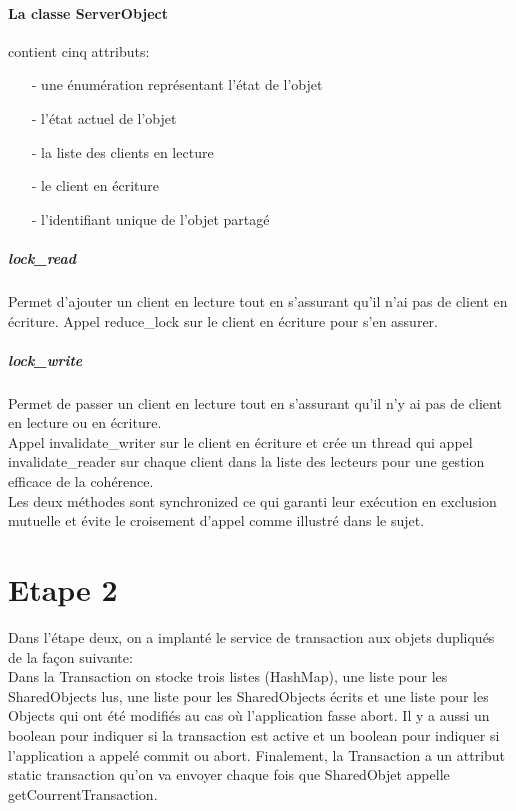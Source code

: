 \documentclass[a4paper,12pt]{article}
\begin{document}
\bigskip

\paragraph{La classe ServerObject}

 contient cinq attributs:
\begin{itemize}
\item[- une énumération représentant l'état de l'objet]
\item[- l'état actuel de l'objet]
\item[- la liste des clients en lecture]
\item[- le client en écriture]
\item[- l'identifiant unique de l'objet partagé]
\end{itemize}

\smallskip
\subparagraph{lock\_read}
Permet d'ajouter un client en lecture tout en s'assurant qu'il n'ai pas de client en écriture. Appel reduce\_lock sur le client en écriture pour s'en assurer.
\subparagraph{lock\_write}
Permet de passer un client en lecture tout en s'assurant qu'il n'y ai pas de client en lecture ou en écriture.\\
Appel invalidate\_writer sur le client en écriture et crée un thread qui appel invalidate\_reader sur chaque client dans la liste des lecteurs pour une gestion efficace de la cohérence.\\

Les deux méthodes sont synchronized ce qui garanti leur exécution en exclusion mutuelle et évite le croisement d'appel comme illustré dans le sujet.


\clearpage
\section{Etape 2}

\bigskip
\bigskip

Dans l’étape deux,  on a implanté le service de transaction aux objets dupliqués de la façon suivante:\\

Dans la Transaction on stocke trois listes (HashMap), une liste pour les SharedObjects lus, une liste pour les SharedObjects écrits et une liste pour les Objects qui ont été modifiés au cas où l’application fasse abort. Il y a aussi un boolean pour indiquer si la transaction est active et un boolean pour indiquer si l’application a appelé commit ou abort. Finalement, la Transaction a un attribut static transaction qu'on va envoyer chaque fois que SharedObjet appelle getCourrentTransaction. \\
\end{document}
